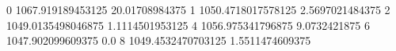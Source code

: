 0 1067.919189453125 20.01708984375
1 1050.4718017578125 2.5697021484375
2 1049.0135498046875 1.1114501953125
4 1056.975341796875 9.0732421875
6 1047.902099609375 0.0
8 1049.4532470703125 1.5511474609375
